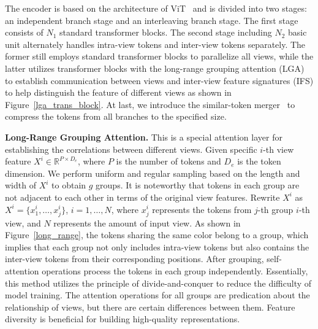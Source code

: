 \documentclass[10pt,twocolumn,letterpaper]{article}
\newcommand{\R}{\mathbb{R}}
\begin{document}
The encoder is based on the architecture of ViT~\cite{dosovitskiy2021image} and is divided into two stages: an independent branch stage and an interleaving branch stage. The first stage consists of $N_1$ standard transformer blocks. The second stage including $N_2$ basic unit alternately handles intra-view tokens and inter-view tokens separately. The former still employs standard transformer blocks to parallelize all views, while the latter utilizes transformer blocks with the long-range grouping attention (LGA) to establish communication between views and inter-view feature signatures (IFS) to help distinguish the feature of different views as shown in Figure~\ref{lga_trans_block}. At last, we introduce the similar-token merger~\cite{zhu2023umi} to compress the tokens from all branches to the specified size.

\textbf{Long-Range Grouping Attention.} This is a special attention layer for establishing the correlations between different views. Given specific $i$-th view feature $X^i\in \R^{P\times D_e}$, where $P$ is the number of tokens and $D_e$ is the token dimension. We perform uniform and regular sampling based on the length and width of $X^i$ to obtain $g$ groups. It is noteworthy that tokens in each group are not adjacent to each other in terms of the original view features. Rewrite $X^i$ as $X^i=\{x_1^i,\ldots,x_j^i\}$, $i=1,\ldots,N$, where $x_j^i$ represents the tokens from $j$-th group $i$-th view, and $N$ represents the amount of input view. As shown in Figure~\ref{long_range}, the tokens sharing the same color belong to a group, which implies that each group not only includes intra-view tokens but also contains the inter-view tokens from their corresponding positions. After grouping, self-attention operations process the tokens in each group independently. Essentially, this method utilizes the principle of divide-and-conquer to reduce the difficulty of model training. The attention operations for all groups are predication about the relationship of views, but there are certain differences between them. Feature diversity is beneficial for building high-quality representations.
\end{document}
